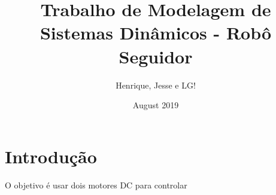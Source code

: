 \documentclass{article}
\title{Trabalho de Modelagem de Sistemas Dinâmicos - Robô Seguidor}
\author{Henrique, Jesse e LG! }
\date{August 2019}
\begin{document}
\maketitle

\section{Introdução}
O objetivo é usar dois motores DC para controlar
\end{document}
